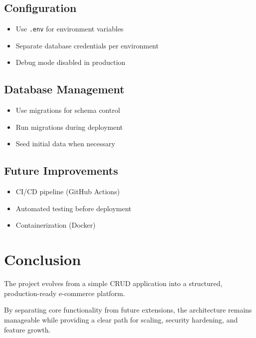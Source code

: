 \documentclass[12pt,a4paper]{article}
\begin{document}
\subsection{Configuration}
\begin{itemize}[noitemsep]
\item Use \texttt{.env} for environment variables
\item Separate database credentials per environment
\item Debug mode disabled in production
\end{itemize}

\subsection{Database Management}
\begin{itemize}[noitemsep]
\item Use migrations for schema control
\item Run migrations during deployment
\item Seed initial data when necessary
\end{itemize}

\subsection{Future Improvements}
\begin{itemize}[noitemsep]
\item CI/CD pipeline (GitHub Actions)
\item Automated testing before deployment
\item Containerization (Docker)
\end{itemize}
\section{Conclusion}

The project evolves from a simple CRUD application into a structured, production-ready e-commerce platform.

By separating core functionality from future extensions, the architecture remains manageable while providing a clear path for scaling, security hardening, and feature growth.
\end{document}
